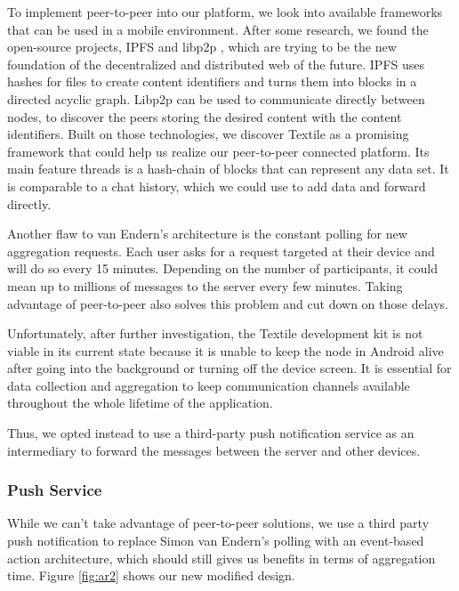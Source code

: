 To implement peer-to-peer into our platform, we look into available frameworks that can be used in a mobile environment. After some research, we found the open-source projects, IPFS \cite{DBLP:journals/corr/Benet14} and libp2p \cite{libp2p}, which are trying to be the new foundation of the decentralized and distributed web of the future. IPFS uses hashes for files to create content identifiers and turns them into blocks in a directed acyclic graph. Libp2p can be used to communicate directly between nodes, to discover the peers storing the desired content with the content identifiers. Built on those technologies, we discover Textile as a promising framework that could help us realize our peer-to-peer connected platform. Its main feature threads is a hash-chain of blocks that can represent any data set. It is comparable to a chat history, which we could use to add data and forward directly.

Another flaw to van Endern's architecture is the constant polling for new aggregation requests. Each user asks for a request targeted at their device and will do so every 15 minutes. Depending on the number of participants, it could mean up to millions of messages to the server every few minutes. Taking advantage of peer-to-peer also solves this problem and cut down on those delays. 

Unfortunately, after further investigation, the Textile development kit is not viable in its current state because it is unable to keep the node in Android alive after going into the background or turning off the device screen. It is essential for data collection and aggregation to keep communication channels available throughout the whole lifetime of the application.

Thus, we opted instead to use a third-party push notification service as an intermediary to forward the messages between the server and other devices.

\subsubsection{Push Service}
While we can't take advantage of peer-to-peer solutions, we use a third party push notification to replace Simon van Endern's polling with an event-based action architecture, which should still gives us benefits in terms of aggregation time. Figure \ref{fig:ar2} shows our new modified design. 


